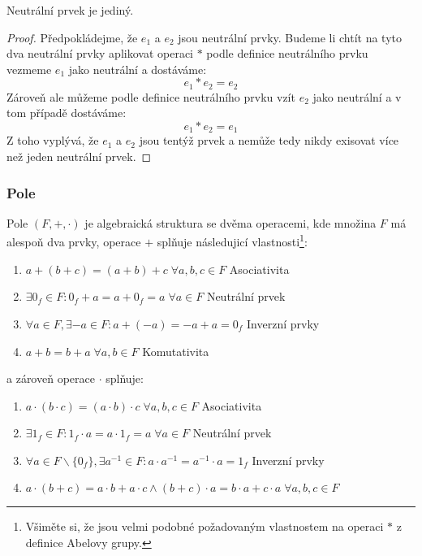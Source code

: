 \begin{theorem}
    Neutrální prvek je jediný.
\end{theorem}
\begin{proof}
    Předpokládejme, že $e_1$ a $e_2$ jsou neutrální prvky. Budeme li chtít na tyto dva neutrální
    prvky aplikovat operaci $*$ podle definice neutrálního prvku vezmeme $e_1$ jako neutrální a
    dostáváme:
    $$e_1 * e_2 = e_2$$
    Zároveň ale můžeme podle definice neutrálního prvku vzít $e_2$ jako neutrální a v tom případě
    dostáváme:
    $$e_1 * e_2 = e_1$$
    Z toho vyplývá, že $e_1$ a $e_2$ jsou tentýž prvek a nemůže tedy nikdy exisovat více než
    jeden neutrální prvek.
\end{proof}

\subsubsection{Pole}
\begin{definition}[Pole]
    Pole $(F, +, \cdot)$ je algebraická struktura se dvěma operacemi, kde množina $F$ má alespoň
    dva prvky, operace $+$ splňuje následujicí vlastnosti\footnote{Všiměte si, že jsou velmi podobné
    požadovaným vlastnostem na operaci $*$ z definice Abelovy grupy.}:
    \begin{enumerate}
        \item $a + (b + c) = (a + b) + c \; \forall a, b, c \in F$ \hfill Asociativita
        \item $\exists 0_f \in F: 0_f + a = a + 0_f = a \; \forall a \in F$ \hfill Neutrální prvek
        \item $\forall a \in F, \exists -a \in F: a + (-a) = -a + a = 0_f$ \hfill Inverzní prvky
        \item $a + b = b + a \; \forall a, b \in F$ \hfill Komutativita
    \end{enumerate}
    a zároveň operace $\cdot$ splňuje:
    \begin{enumerate}
        \item $a \cdot (b \cdot c) = (a \cdot b) \cdot c \; \forall a, b, c \in F$ \hfill Asociativita
        \item $\exists 1_f \in F: 1_f \cdot a = a \cdot 1_f = a \; \forall a \in F$ \hfill Neutrální prvek
        \item $\forall a \in F \smallsetminus \{0_f\}, \exists a^{-1} \in F: a \cdot
        a^{-1} = a^{-1} \cdot a = 1_f$ \hfill Inverzní prvky
        \item $a \cdot (b + c) = a \cdot b + a \cdot c \wedge (b + c) \cdot a = b \cdot a + c \cdot a
        \; \forall a, b,c \in F$ \hfill

    \end{enumerate}
    \label{def:field}
\end{definition}

